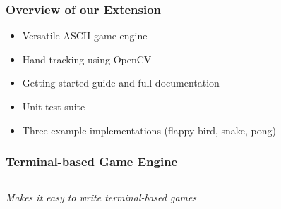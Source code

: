 \documentclass{beamer}
\begin{document}
\begin{frame}
	\frametitle{Overview of our Extension}
	\begin{itemize}
		\item Versatile ASCII game engine
		\item Hand tracking using OpenCV
		\item Getting started guide and full documentation
		\item Unit test suite
		\item Three example implementations (flappy bird, snake, pong)
	\end{itemize}
\end{frame}

\begin{frame}
	\frametitle{Terminal-based Game Engine}
	\begin{columns}
		\begin{column}{0.625\textwidth}
			\emph{Makes it easy to write terminal-based games}
			

\end{column}
\end{columns}
\end{frame}
\end{document}
